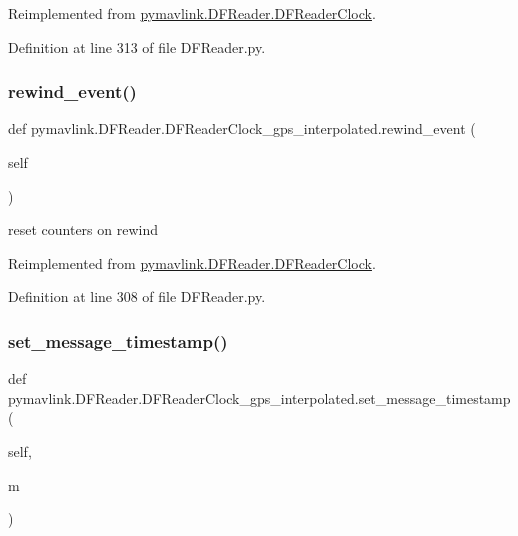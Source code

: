 Reimplemented from \mbox{\hyperlink{classpymavlink_1_1DFReader_1_1DFReaderClock_a49037f269d69afa423bc7c4a5e1983ba}{pymavlink.\+D\+F\+Reader.\+D\+F\+Reader\+Clock}}.



Definition at line 313 of file D\+F\+Reader.\+py.

\mbox{\label{classpymavlink_1_1DFReader_1_1DFReaderClock__gps__interpolated_a17d0356947948b2bbeb7a47531515c72}} 
\subsubsection{\texorpdfstring{rewind\_event()}{rewind\_event()}}
{\footnotesize\ttfamily def pymavlink.\+D\+F\+Reader.\+D\+F\+Reader\+Clock\+\_\+gps\+\_\+interpolated.\+rewind\+\_\+event (\begin{DoxyParamCaption}\item[{}]{self }\end{DoxyParamCaption})}

\begin{DoxyVerb}reset counters on rewind\end{DoxyVerb}
 

Reimplemented from \mbox{\hyperlink{classpymavlink_1_1DFReader_1_1DFReaderClock_a8216097142372761ae67e0ffd8ab5e69}{pymavlink.\+D\+F\+Reader.\+D\+F\+Reader\+Clock}}.



Definition at line 308 of file D\+F\+Reader.\+py.

\mbox{\label{classpymavlink_1_1DFReader_1_1DFReaderClock__gps__interpolated_aead72c7143461d54d934f541dbc03e41}} 
\subsubsection{\texorpdfstring{set\_message\_timestamp()}{set\_message\_timestamp()}}
{\footnotesize\ttfamily def pymavlink.\+D\+F\+Reader.\+D\+F\+Reader\+Clock\+\_\+gps\+\_\+interpolated.\+set\+\_\+message\+\_\+timestamp (\begin{DoxyParamCaption}\item[{}]{self,  }\item[{}]{m }\end{DoxyParamCaption})}



